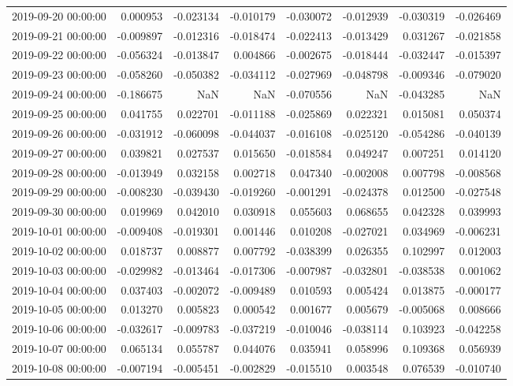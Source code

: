 \begin{tabular}{lrrrrrrr}
2019-09-20 00:00:00 & 0.000953 & -0.023134 & -0.010179 & -0.030072 & -0.012939 & -0.030319 & -0.026469 \\
2019-09-21 00:00:00 & -0.009897 & -0.012316 & -0.018474 & -0.022413 & -0.013429 & 0.031267 & -0.021858 \\
2019-09-22 00:00:00 & -0.056324 & -0.013847 & 0.004866 & -0.002675 & -0.018444 & -0.032447 & -0.015397 \\
2019-09-23 00:00:00 & -0.058260 & -0.050382 & -0.034112 & -0.027969 & -0.048798 & -0.009346 & -0.079020 \\
2019-09-24 00:00:00 & -0.186675 & NaN & NaN & -0.070556 & NaN & -0.043285 & NaN \\
2019-09-25 00:00:00 & 0.041755 & 0.022701 & -0.011188 & -0.025869 & 0.022321 & 0.015081 & 0.050374 \\
2019-09-26 00:00:00 & -0.031912 & -0.060098 & -0.044037 & -0.016108 & -0.025120 & -0.054286 & -0.040139 \\
2019-09-27 00:00:00 & 0.039821 & 0.027537 & 0.015650 & -0.018584 & 0.049247 & 0.007251 & 0.014120 \\
2019-09-28 00:00:00 & -0.013949 & 0.032158 & 0.002718 & 0.047340 & -0.002008 & 0.007798 & -0.008568 \\
2019-09-29 00:00:00 & -0.008230 & -0.039430 & -0.019260 & -0.001291 & -0.024378 & 0.012500 & -0.027548 \\
2019-09-30 00:00:00 & 0.019969 & 0.042010 & 0.030918 & 0.055603 & 0.068655 & 0.042328 & 0.039993 \\
2019-10-01 00:00:00 & -0.009408 & -0.019301 & 0.001446 & 0.010208 & -0.027021 & 0.034969 & -0.006231 \\
2019-10-02 00:00:00 & 0.018737 & 0.008877 & 0.007792 & -0.038399 & 0.026355 & 0.102997 & 0.012003 \\
2019-10-03 00:00:00 & -0.029982 & -0.013464 & -0.017306 & -0.007987 & -0.032801 & -0.038538 & 0.001062 \\
2019-10-04 00:00:00 & 0.037403 & -0.002072 & -0.009489 & 0.010593 & 0.005424 & 0.013875 & -0.000177 \\
2019-10-05 00:00:00 & 0.013270 & 0.005823 & 0.000542 & 0.001677 & 0.005679 & -0.005068 & 0.008666 \\
2019-10-06 00:00:00 & -0.032617 & -0.009783 & -0.037219 & -0.010046 & -0.038114 & 0.103923 & -0.042258 \\
2019-10-07 00:00:00 & 0.065134 & 0.055787 & 0.044076 & 0.035941 & 0.058996 & 0.109368 & 0.056939 \\
2019-10-08 00:00:00 & -0.007194 & -0.005451 & -0.002829 & -0.015510 & 0.003548 & 0.076539 & -0.010740 \\

\end{tabular}
